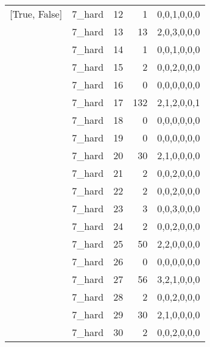 \begin{tabular}{llrrl}
 [True, False]   & 7\_hard              &            12 &                     1 & 0,0,1,0,0,0   \\
 [True, False]   & 7\_hard              &            13 &                    13 & 2,0,3,0,0,0   \\
 [True, False]   & 7\_hard              &            14 &                     1 & 0,0,1,0,0,0   \\
 [True, False]   & 7\_hard              &            15 &                     2 & 0,0,2,0,0,0   \\
 [True, False]   & 7\_hard              &            16 &                     0 & 0,0,0,0,0,0   \\
 [True, False]   & 7\_hard              &            17 &                   132 & 2,1,2,0,0,1   \\
 [True, False]   & 7\_hard              &            18 &                     0 & 0,0,0,0,0,0   \\
 [True, False]   & 7\_hard              &            19 &                     0 & 0,0,0,0,0,0   \\
 [True, False]   & 7\_hard              &            20 &                    30 & 2,1,0,0,0,0   \\
 [True, False]   & 7\_hard              &            21 &                     2 & 0,0,2,0,0,0   \\
 [True, False]   & 7\_hard              &            22 &                     2 & 0,0,2,0,0,0   \\
 [True, False]   & 7\_hard              &            23 &                     3 & 0,0,3,0,0,0   \\
 [True, False]   & 7\_hard              &            24 &                     2 & 0,0,2,0,0,0   \\
 [True, False]   & 7\_hard              &            25 &                    50 & 2,2,0,0,0,0   \\
 [True, False]   & 7\_hard              &            26 &                     0 & 0,0,0,0,0,0   \\
 [True, False]   & 7\_hard              &            27 &                    56 & 3,2,1,0,0,0   \\
 [True, False]   & 7\_hard              &            28 &                     2 & 0,0,2,0,0,0   \\
 [True, False]   & 7\_hard              &            29 &                    30 & 2,1,0,0,0,0   \\
 [True, False]   & 7\_hard              &            30 &                     2 & 0,0,2,0,0,0   \\

\end{tabular}

